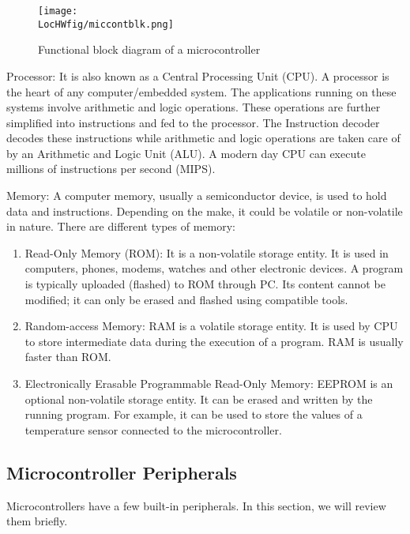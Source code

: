 \begin{figure}
  \centering
  \texttt{[image: \\LocHWfig/miccontblk.png]}
  \caption{Functional block diagram of a microcontroller}
  \label{micro-arch}
\end{figure}

\begin{description}
  \item {Processor:} It is also known as a Central Processing Unit
        (CPU).  A processor is the heart of any computer/embedded
        system. The applications running on these systems involve arithmetic
        and logic operations. These operations are further simplified into
        instructions and fed to the processor.  The Instruction decoder
        decodes these instructions while arithmetic and logic operations are
        taken care of by an Arithmetic and Logic Unit (ALU). A modern day
        CPU can execute millions of instructions per second (MIPS).

  \item {Memory:}
        A computer memory, usually a semiconductor device, is used to hold data and instructions. Depending on the make, it could be volatile or non-volatile in nature. There are different types of memory:
        \begin{enumerate}
          \item Read-Only Memory (ROM): It is a non-volatile storage entity. It
                is used in computers, phones, modems, watches and other electronic
                devices. A program is typically uploaded (flashed) to ROM through PC.
                Its content cannot be modified; it can only be erased and flashed
                using compatible tools.
          \item Random-access Memory: RAM is a volatile storage entity. It is
                used by CPU to store intermediate data during the execution of a
                program. RAM is usually faster than ROM.
          \item Electronically Erasable Programmable Read-Only Memory: EEPROM is
                an optional non-volatile storage entity. It can be erased and
                written by the running program.  For example, it can be used to
                store the values of a temperature sensor connected to the microcontroller.
        \end{enumerate}
\end{description}

\subsection{Microcontroller Peripherals}
Microcontrollers have a few built-in peripherals.  In this section, we
will review them briefly.

